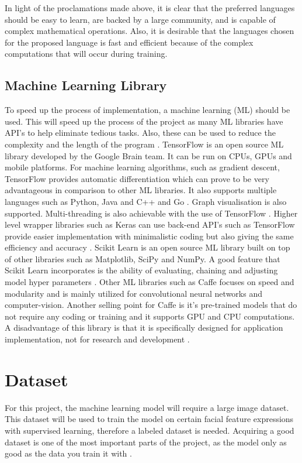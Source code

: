 In light of the proclamations made above, it is clear that the preferred languages should be easy to learn, are backed by a large community, and is capable of complex mathematical operations. Also, it is desirable that the languages chosen for the proposed language is fast and efficient because of the complex computations that will occur during training.

\newpage

\subsection{Machine Learning Library}
To speed up the process of implementation, a machine learning (ML) should be used. This will speed up the process of the project as many ML libraries have API's to help eliminate tedious tasks. Also, these can be used to reduce the complexity and the length of the program \citep{jain}.
TensorFlow is an open source ML library developed by the Google Brain team. It can be run on CPUs, GPUs and mobile platforms. For machine learning algorithms, such as gradient descent, TensorFlow provides automatic differentiation which can prove to be very advantageous in comparison to other ML libraries. It also supports multiple languages such as Python, Java and C++ and Go \citep{jain}. Graph visualisation is also supported. Multi-threading is also achievable with the use of TensorFlow \citep{jain}. Higher level wrapper libraries such as Keras can use back-end API's such as TensorFlow provide easier implementation with minimalistic coding but also giving the same efficiency and accuracy \citep{lee_keras}. Scikit Learn is an open source ML library built on top of other libraries such as Matplotlib, SciPy and NumPy. A good feature that Scikit Learn incorporates is the ability of evaluating, chaining and adjusting model hyper parameters \citep{jain}.
Other ML libraries such as Caffe focuses on speed and modularity and is mainly utilized for convolutional neural networks and computer-vision. Another selling point for Caffe is it's pre-trained models that do not require any coding or training and it supports GPU and CPU computations. A disadvantage of this library is that it is specifically designed for application implementation, not for research and development \citep{jain}.

\section{Dataset}
For this project, the machine learning model will require a large image dataset. This dataset will be used to train the model on certain facial feature expressions with supervised learning, therefore a labeled dataset is needed. Acquiring a good dataset is one of the most important parts of the project, as the model only as good as the data you train it with \citep{capg}.

